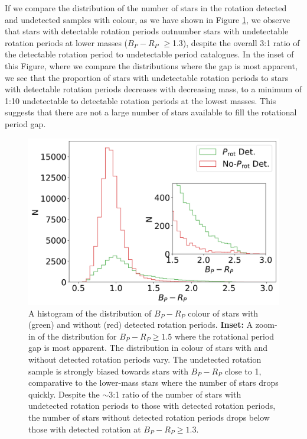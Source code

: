 If we compare the distribution of the number of stars in the rotation detected and undetected samples with colour, as we have shown in Figure \ref{fig:n_det_nondet}, we observe that stars with detectable rotation periods outnumber stars with undetectable rotation periods at lower masses ($B_P-R_P$ $\geq$1.3), despite the overall 3:1 ratio of the detectable rotation period to undetectable period catalogues.
In the inset of this Figure, where we compare the distributions where the gap is most apparent, we see that the proportion of stars with undetectable rotation periods to stars with detectable rotation periods decreases with decreasing mass, to a minimum of 1:10 undetectable to detectable rotation periods at the lowest masses.
This suggests that there are not a large number of stars available to fill the rotational period gap.

\begin{figure}
\centering
  \includegraphics[width=\textwidth]{Figures/rot_gap_figures/hist_obs.png}
  \caption{A histogram of the distribution of $B_P-R_P$ colour of stars with (green) and without (red) detected rotation periods. \textbf{Inset:} A zoom-in of the distribution for $B_P-R_P\geq1.5$ where the rotational period gap is most apparent. The distribution in colour of stars with and without detected rotation periods vary. The undetected rotation sample is strongly biased towards stars with $B_P-R_P$ close to 1, comparative to the lower-mass stars where the number of stars drops quickly. Despite the $\sim$3:1 ratio of the number of stars with undetected rotation periods to those with detected rotation periods, the number of stars without detected rotation periods drops below those with detected rotation at $B_P-R_P\geq1.3$.
  	}
  \label{fig:n_det_nondet}
\end{figure}

